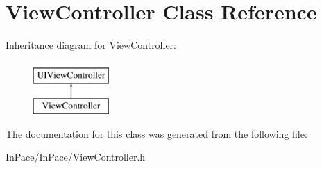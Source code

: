 \hypertarget{interfaceViewController}{\section{View\-Controller Class Reference}
\label{interfaceViewController}
}
Inheritance diagram for View\-Controller\-:\begin{figure}[H]
\begin{center}
\leavevmode
\includegraphics[height=2.000000cm]{interfaceViewController}
\end{center}
\end{figure}


The documentation for this class was generated from the following file\-:\begin{DoxyCompactItemize}
\item 
In\-Pace/\-In\-Pace/View\-Controller.\-h\end{DoxyCompactItemize}

